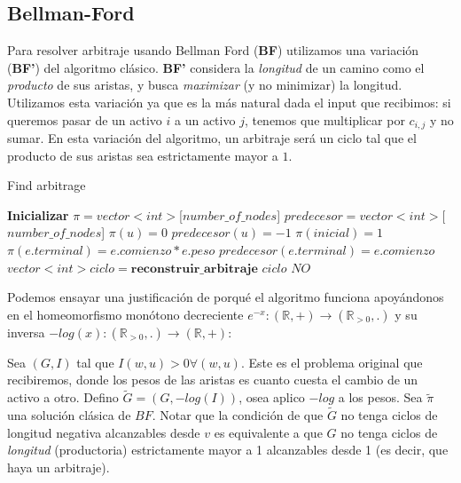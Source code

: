 \subsection{Bellman-Ford}
 \label{res-bell}
Para resolver arbitraje usando Bellman Ford (\textbf{BF}) utilizamos una variación (\textbf{BF'}) del algoritmo clásico. \textbf{BF'} considera la \textit{longitud} de un camino como el \textit{producto} de sus aristas, y busca \textit{maximizar} (y no minimizar) la longitud. Utilizamos esta variación ya que es la más natural dada el input que recibimos: si queremos pasar de un activo $i$ a un activo $j$, tenemos que  multiplicar por $c_{i,j}$ y no sumar. En esta variación del algoritmo, un arbitraje será un ciclo tal que el producto de sus aristas sea estrictamente mayor a $1$.

\begin{algorithm}[H]
\caption{Find arbitrage}
\begin{algorithmic}[1]
	\State \textbf{Inicializar}
	\State $\pi = vector<int>$[$number\_of\_nodes$]
	\State $predecesor = vector<int>$[$number\_of\_nodes$]
		\State $\pi(u) = 0$
		\State $predecesor(u) = -1$
	\EndFor
	\State $\pi(inicial) = 1$
	\Statex								
				\State $\pi (e.terminal)=e.comienzo * e.peso$
				\State $predecesor (e.terminal) = e.comienzo$
			\EndIf		
		\EndFor
	\EndFor
	\Statex
			\State $vector<int> ciclo = \textbf{reconstruir_arbitraje}$
			\State \Return $ciclo$
		\EndIf
	\EndFor
	\Statex
	\State \Return $NO$
\EndFunction
\end{algorithmic}
\end{algorithm}

Podemos ensayar una justificación de porqué el algoritmo funciona apoyándonos en el homeomorfismo monótono decreciente $e^{-x} :(\mathbb{R}, +) \longrightarrow (\mathbb{R}_{>0}, .) $ y su inversa $-log(x) : (\mathbb{R}_{>0}, .) \longrightarrow (\mathbb{R}, +)$:

Sea $(G,I)$ tal que $I(w,u) > 0 \forall (w,u)$. Este es el problema original que recibiremos, donde los pesos de las aristas es cuanto cuesta el cambio de un activo a otro. Defino $\tilde{G} = (G, -log(I))$, osea aplico $-log$ a los pesos. Sea $\tilde{\pi}$ una solución clásica de $BF$. Notar que la condición de que $\tilde{G}$ no tenga ciclos de longitud negativa alcanzables desde $v$ es equivalente a que $G$ no tenga ciclos de \textit{longitud} (productoria) estrictamente mayor a 1 alcanzables desde 1 (es decir, que haya un arbitraje). 

